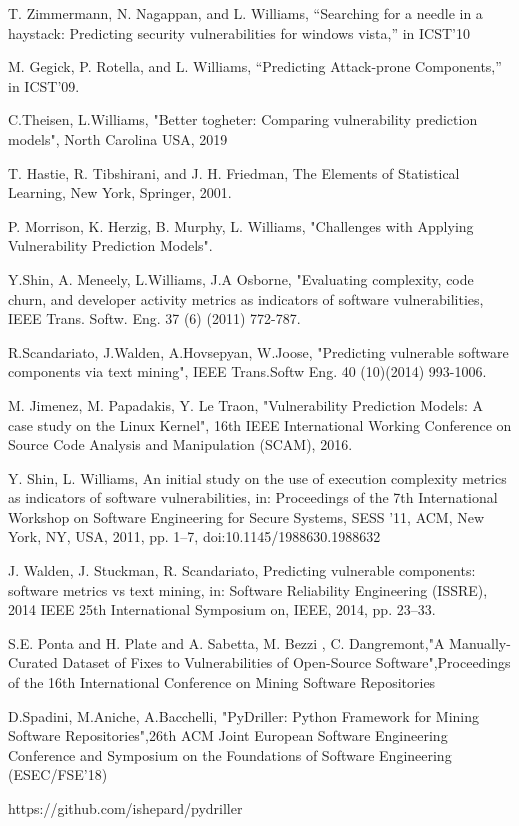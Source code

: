 \documentclass[twocolumn,10pt]{asme2ej}
\begin{document}
\newpage

\begin{thebibliography}{9}
T. Zimmermann, N. Nagappan, and L. Williams, “Searching for a needle
in a haystack: Predicting security vulnerabilities for windows vista,” in
ICST’10

 M. Gegick, P. Rotella, and L. Williams, “Predicting Attack-prone
Components,” in ICST’09.

C.Theisen, L.Williams, "Better togheter: Comparing vulnerability prediction models", North Carolina USA, 2019

T. Hastie, R. Tibshirani, and J. H. Friedman, The Elements of Statistical Learning, New York, Springer, 2001.

P. Morrison, K. Herzig, B. Murphy, L. Williams, "Challenges with Applying
Vulnerability Prediction Models".


Y.Shin, A. Meneely, L.Williams, J.A Osborne, "Evaluating complexity, code churn, and developer activity metrics as indicators of software vulnerabilities, IEEE Trans. Softw. Eng. 37 (6) (2011) 772-787.

R.Scandariato, J.Walden, A.Hovsepyan, W.Joose, "Predicting vulnerable software components via text mining", IEEE Trans.Softw Eng. 40 (10)(2014) 993-1006.

M. Jimenez, M. Papadakis, Y. Le Traon, "Vulnerability Prediction Models: A case study on
the Linux Kernel", 16th IEEE International Working Conference on Source Code Analysis and Manipulation (SCAM), 2016.

Y. Shin, L. Williams, An initial study on the use of execution complexity metrics as indicators of software vulnerabilities, in: Proceedings of the 7th International Workshop on Software Engineering for Secure Systems, SESS ’11, ACM, New York,
NY, USA, 2011, pp. 1–7, doi:10.1145/1988630.1988632

 J. Walden, J. Stuckman, R. Scandariato, Predicting vulnerable components: software
metrics vs text mining, in: Software Reliability Engineering (ISSRE), 2014 IEEE 25th
International Symposium on, IEEE, 2014, pp. 23–33.

S.E. Ponta and H. Plate and A. Sabetta, M. Bezzi ,
    C. Dangremont,"A Manually-Curated Dataset of Fixes to Vulnerabilities of Open-Source Software",Proceedings of the 16th International Conference on Mining Software Repositories

D.Spadini, M.Aniche, A.Bacchelli, "PyDriller: Python Framework for Mining Software Repositories",26th ACM Joint European Software Engineering Conference and Symposium on the Foundations of Software Engineering (ESEC/FSE'18)

https://github.com/ishepard/pydriller





\end{thebibliography}
\end{document}
